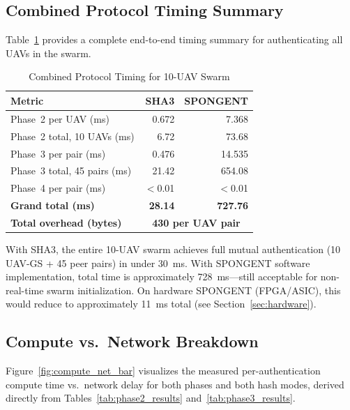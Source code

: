 \documentclass[11pt,a4paper]{article}
\begin{document}
\subsection{Combined Protocol Timing Summary}

Table~\ref{tab:combined_timing} provides a complete end-to-end timing summary for authenticating all UAVs in the swarm.

\begin{table}[H]
\centering
\caption{Combined Protocol Timing for 10-UAV Swarm}
\label{tab:combined_timing}
\begin{tabular}{@{}lrr@{}}
\toprule
\textbf{Metric} & \textbf{SHA3} & \textbf{SPONGENT} \\
\midrule
Phase~2 per UAV (ms) & 0.672 & 7.368 \\
Phase~2 total, 10 UAVs (ms) & 6.72 & 73.68 \\
Phase~3 per pair (ms) & 0.476 & 14.535 \\
Phase~3 total, 45 pairs (ms) & 21.42 & 654.08 \\
Phase~4 per pair (ms) & $<$0.01 & $<$0.01 \\
\midrule
\textbf{Grand total (ms)} & \textbf{28.14} & \textbf{727.76} \\
\textbf{Total overhead (bytes)} & \multicolumn{2}{c}{\textbf{430 per UAV pair}} \\
\bottomrule
\end{tabular}
\end{table}

With SHA3, the entire 10-UAV swarm achieves full mutual authentication (10 UAV-GS + 45 peer pairs) in under 30~ms. With SPONGENT software implementation, total time is approximately 728~ms---still acceptable for non-real-time swarm initialization. On hardware SPONGENT (FPGA/ASIC), this would reduce to approximately 11~ms total (see Section~\ref{sec:hardware}).

\subsection{Compute vs.\ Network Breakdown}

Figure~\ref{fig:compute_net_bar} visualizes the measured per-authentication compute time vs.\ network delay for both phases and both hash modes, derived directly from Tables~\ref{tab:phase2_results} and~\ref{tab:phase3_results}.
\end{document}
